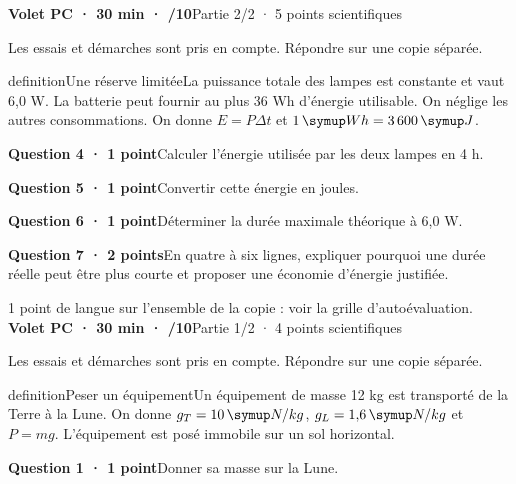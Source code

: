 \vfill{}
\noindent\textbf{Volet PC · 30 min · /10}\hfill Partie 2/2 · 5 points scientifiques
\par\vspace{2mm}Les essais et démarches sont pris en compte. Répondre sur une copie séparée.\par
\begin{pcEncadre}{definition}{Une réserve limitée}La puissance totale des lampes est constante et vaut 6,0 W. La batterie peut fournir au plus 36 Wh d’énergie utilisable. On néglige les autres consommations. On donne $E=P\Delta t$ et $1\unite{Wh}=3\,600\unite J$.\end{pcEncadre}
\par\addvspace{3mm}\noindent\textbf{Question 4 · 1 point}\quad Calculer l’énergie utilisée par les deux lampes en 4 h.\par
\par\addvspace{3mm}\noindent\textbf{Question 5 · 1 point}\quad Convertir cette énergie en joules.\par
\par\addvspace{3mm}\noindent\textbf{Question 6 · 1 point}\quad Déterminer la durée maximale théorique à 6,0 W.\par
\par\addvspace{3mm}\noindent\textbf{Question 7 · 2 points}\quad En quatre à six lignes, expliquer pourquoi une durée réelle peut être plus courte et proposer une économie d’énergie justifiée.\par
\vfill{}
{\small 1 point de langue sur l’ensemble de la copie : voir la grille d’autoévaluation.}
\label{bb-4}
\noindent\textbf{Volet PC · 30 min · /10}\hfill Partie 1/2 · 4 points scientifiques
\par\vspace{2mm}Les essais et démarches sont pris en compte. Répondre sur une copie séparée.\par
\begin{pcEncadre}{definition}{Peser un équipement}Un équipement de masse 12 kg est transporté de la Terre à la Lune. On donne $g_T=10\unite{N/kg}$, $g_L=1{,}6\unite{N/kg}$ et $P=mg$. L’équipement est posé immobile sur un sol horizontal.\end{pcEncadre}
\par\addvspace{3mm}\noindent\textbf{Question 1 · 1 point}\quad Donner sa masse sur la Lune.\par
